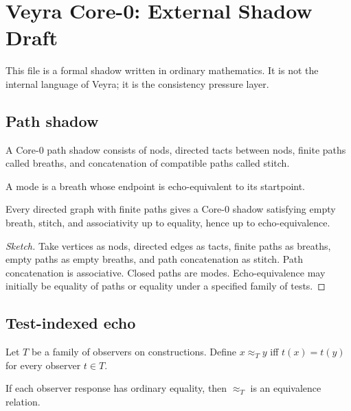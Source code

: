 \section{Veyra Core-0: External Shadow Draft}

This file is a formal shadow written in ordinary mathematics. It is not the internal language of Veyra; it is the consistency pressure layer.

\subsection{Path shadow}

\begin{definition}
A Core-0 path shadow consists of nods, directed tacts between nods, finite paths called breaths, and concatenation of compatible paths called stitch.
\end{definition}

\begin{definition}[Mode]
A mode is a breath whose endpoint is echo-equivalent to its startpoint.
\end{definition}

\begin{lemma}
Every directed graph with finite paths gives a Core-0 shadow satisfying empty breath, stitch, and associativity up to equality, hence up to echo-equivalence.
\end{lemma}

\begin{proof}[Sketch]
Take vertices as nods, directed edges as tacts, finite paths as breaths, empty paths as empty breaths, and path concatenation as stitch. Path concatenation is associative. Closed paths are modes. Echo-equivalence may initially be equality of paths or equality under a specified family of tests.
\end{proof}

\subsection{Test-indexed echo}

\begin{definition}
Let $T$ be a family of observers on constructions. Define $x \approx_T y$ iff $t(x)=t(y)$ for every observer $t\in T$.
\end{definition}

\begin{lemma}
If each observer response has ordinary equality, then $\approx_T$ is an equivalence relation.
\end{lemma}


